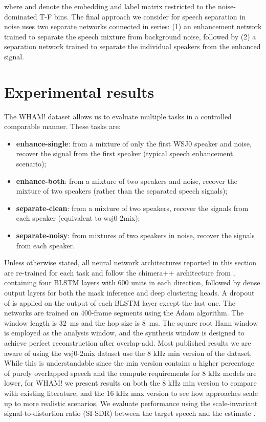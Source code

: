 \documentclass[a4paper]{article}
\begin{document}
where  and  denote the embedding and label matrix restricted to the noise-dominated T-F bins.  The final approach we consider for speech separation in noise uses two separate networks connected in series: (1) an enhancement network trained to separate the speech mixture from background noise, followed by (2) a separation network trained to separate the individual speakers from the enhanced signal.

\section{Experimental results}
The WHAM! dataset allows us to evaluate multiple tasks in a controlled comparable manner.  These tasks are:
\begin{itemize}[leftmargin=6mm, topsep=0pt]
    \setlength{\itemsep}{0pt}
    \setlength{\parsep}{3pt}
    \setlength{\parskip}{3pt}
        \item \textbf{enhance-single}: from a mixture of only the first WSJ0 speaker and noise, recover the signal from the first speaker (typical speech enhancement scenario);
        \item \textbf{enhance-both}: from a mixture of two speakers and noise, recover the mixture of two speakers (rather than the separated speech signals);
        \item \textbf{separate-clean}: from a mixture of two speakers, recover the signals from each speaker (equivalent to wsj0-2mix);
        \item \textbf{separate-noisy}: from mixtures of two speakers in noise, recover the signals from each speaker.
    \vspace{3pt}
\end{itemize}

Unless otherwise stated, all neural network architectures reported in this section are re-trained for each task and follow the chimera++ architecture from \cite{Wang2018Interspeech09}, containing four BLSTM layers with 600 units in each direction, followed by dense output layers for both the mask inference and deep clustering heads. A dropout of  is applied on the output of each BLSTM layer except the last one. The networks are trained on 400-frame segments using the Adam algorithm. The window length is 32~ms and the hop size is 8~ms. The square root Hann window is employed as the analysis window, and the synthesis window is designed to achieve perfect reconstruction after overlap-add.  Most published results we are aware of using the wsj0-2mix dataset use the 8 kHz min version of the dataset.  While this is understandable since the min version contains a higher percentage of purely overlapped speech and the compute requirements for 8 kHz models are lower, for WHAM! we present results on both the 8 kHz min version to compare with existing literature, and the 16 kHz max version to see how approaches scale up to more realistic scenarios.  We evaluate performance using the scale-invariant signal-to-distortion ratio (SI-SDR) between the target speech and the estimate \cite{LeRoux2018SISDR}.
\end{document}
